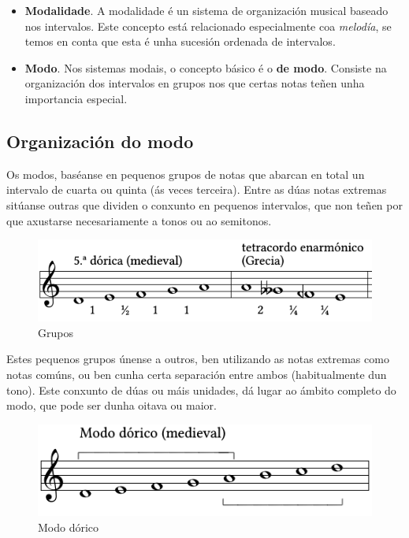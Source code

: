 \documentclass[a4paper, twoside]{templates/ociamthesis}
\begin{document}
\begin{itemize}
\item
  \textbf{Modalidade}. A modalidade é un sistema de organización musical baseado nos intervalos. Este concepto está relacionado especialmente coa \emph{melodía}, se temos en conta que esta é unha sucesión ordenada de intervalos.
\item
  \textbf{Modo}. Nos sistemas modais, o concepto básico é o \textbf{de modo}. Consiste na organización dos intervalos en grupos nos que certas notas teñen unha importancia especial.
\end{itemize}

\hypertarget{organizaciuxf3n-do-modo}{%
\subsection{Organización do modo}\label{organizaciuxf3n-do-modo}}

Os modos, baséanse en pequenos grupos de notas que abarcan en total un intervalo de cuarta ou quinta (ás veces terceira). Entre as dúas notas extremas sitúanse outras que dividen o conxunto en pequenos intervalos, que non teñen por que axustarse necesariamente a tonos ou ao semitonos.

\begin{figure}
\centering
\includegraphics{figures/ud-03/grupos.png}
\caption{Grupos}
\end{figure}

Estes pequenos grupos únense a outros, ben utilizando as notas extremas como notas comúns, ou ben cunha certa separación entre ambos (habitualmente dun tono). Este conxunto de dúas ou máis unidades, dá lugar ao ámbito completo do modo, que pode ser dunha oitava ou maior.

\begin{figure}
\centering
\includegraphics{figures/ud-03/escalas-2.png}
\caption{Modo dórico}
\end{figure}
\end{document}
